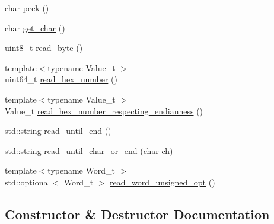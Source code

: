 \begin{DoxyCompactItemize}
char \mbox{\hyperlink{classxd_1_1dbg_1_1gdbstub_1_1pkt_1_1_g_d_b_request_packet_base_a6b649362a56beb8097504824f1ae8274}{peek}} ()
\item 
char \mbox{\hyperlink{classxd_1_1dbg_1_1gdbstub_1_1pkt_1_1_g_d_b_request_packet_base_a5c6c384a330f51cc2c32bcb624f9d961}{get\+\_\+char}} ()
\item 
uint8\+\_\+t \mbox{\hyperlink{classxd_1_1dbg_1_1gdbstub_1_1pkt_1_1_g_d_b_request_packet_base_ad2280af91e15d1fb1a0acbf8be70960d}{read\+\_\+byte}} ()
\item 
{\footnotesize template$<$typename Value\+\_\+t $>$ }\\uint64\+\_\+t \mbox{\hyperlink{classxd_1_1dbg_1_1gdbstub_1_1pkt_1_1_g_d_b_request_packet_base_ac923208cd61bdc18e54c47fafbdc6c5c}{read\+\_\+hex\+\_\+number}} ()
\item 
{\footnotesize template$<$typename Value\+\_\+t $>$ }\\Value\+\_\+t \mbox{\hyperlink{classxd_1_1dbg_1_1gdbstub_1_1pkt_1_1_g_d_b_request_packet_base_a5b1aac6673dd65e936c54121ffc0b325}{read\+\_\+hex\+\_\+number\+\_\+respecting\+\_\+endianness}} ()
\item 
std\+::string \mbox{\hyperlink{classxd_1_1dbg_1_1gdbstub_1_1pkt_1_1_g_d_b_request_packet_base_ab179b1bbbfbbb5d1578a2f46c44d6a9a}{read\+\_\+until\+\_\+end}} ()
\item 
std\+::string \mbox{\hyperlink{classxd_1_1dbg_1_1gdbstub_1_1pkt_1_1_g_d_b_request_packet_base_ada655ac04bf9f4dc291a2b8228f1a937}{read\+\_\+until\+\_\+char\+\_\+or\+\_\+end}} (char ch)
\item 
{\footnotesize template$<$typename Word\+\_\+t $>$ }\\std\+::optional$<$ Word\+\_\+t $>$ \mbox{\hyperlink{classxd_1_1dbg_1_1gdbstub_1_1pkt_1_1_g_d_b_request_packet_base_a1897d26c66dec2bf61585a675ca3a99d}{read\+\_\+word\+\_\+unsigned\+\_\+opt}} ()
\end{DoxyCompactItemize}


\subsection{Constructor \& Destructor Documentation}
\mbox{\label{classxd_1_1dbg_1_1gdbstub_1_1pkt_1_1_g_d_b_request_packet_base_ae91027b9e0fa4845ddd377e981d8c959}} 
